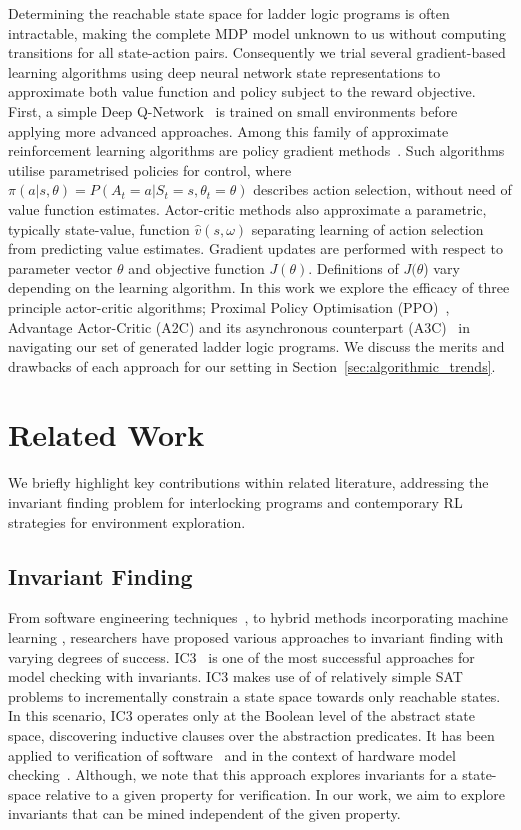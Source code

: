 \documentclass[runningheads]{llncs}
\begin{document}
Determining the reachable state space for ladder logic programs is often intractable, making the complete MDP model unknown to us without computing transitions for all state-action pairs. Consequently we trial several gradient-based learning algorithms using deep neural network state representations to approximate both value function and policy subject to the reward objective. First, a simple Deep Q-Network~\cite{mnih2013playing} is trained on small environments before applying more advanced approaches. Among this family of approximate reinforcement learning algorithms are policy gradient methods~\cite{kakade2001natural}. Such algorithms utilise parametrised policies for control, where $\pi(a|s,\theta) = P(A_t=a|S_t=s,\theta_t=\theta)$ describes action selection, without need of value function estimates. Actor-critic methods also approximate a parametric, typically state-value, function $\hat{v}(s,\omega)$ separating learning of action selection from predicting value estimates. Gradient updates are performed with respect to parameter vector $\theta$ and objective function $J(\theta)$. Definitions of $J(\theta$) vary depending on the learning algorithm.  In this work we explore the efficacy of three principle actor-critic algorithms; Proximal Policy Optimisation (PPO)~\cite{schulman2017proximal}, Advantage Actor-Critic (A2C) and its asynchronous counterpart (A3C)~\cite{mnih2016asynchronous} in navigating our set of generated ladder logic programs. We discuss the merits and drawbacks of each approach for our setting in Section~\ref{sec:algorithmic_trends}.

\section{Related Work}
We briefly highlight key contributions within related literature, addressing the invariant finding problem for interlocking programs and contemporary RL strategies for environment exploration.

\subsection{Invariant Finding}
From software engineering techniques~\cite{case2007automated, bensalem1996powerful}, to hybrid methods incorporating machine learning \cite{garg2016learning}, researchers have proposed various approaches to invariant finding with varying degrees of success. 
IC3~\cite{bradley11} is one of the most successful approaches for model checking with invariants. IC3 makes use of of relatively simple SAT problems to incrementally constrain a state space towards only reachable states. In this scenario, IC3 operates only at the Boolean level of the abstract state space, discovering inductive clauses over the abstraction predicates. It has been applied to verification of software~\cite{cimatti12} and in the context of hardware model checking~\cite{bradley07}. Although, we note that this approach explores invariants for a state-space relative to a given property for verification. In our work, we aim to explore invariants that can be mined independent of the given property.
\end{document}
